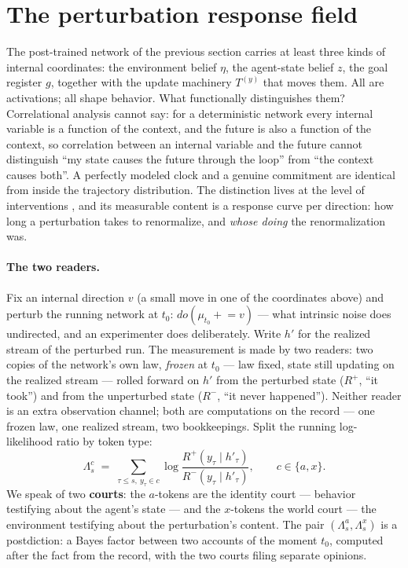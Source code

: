 \documentclass[11pt]{article}
\begin{document}
\section{The perturbation response field}
\label{sec:kappa}

The post-trained network of the previous section carries at least three kinds of internal coordinates: the environment belief $\eta$, the agent-state belief $z$, the goal register $g$, together with the update machinery $T^{(y)}$ that moves them. All are activations; all shape behavior. What functionally distinguishes them? Correlational analysis cannot say: for a deterministic network every internal variable is a function of the context, and the future is also a function of the context, so correlation between an internal variable and the future cannot distinguish ``my state causes the future through the loop'' from ``the context causes both''. A perfectly modeled clock and a genuine commitment are identical from inside the trajectory distribution. The distinction lives at the level of interventions \citep{pearl2009}, and its measurable content is a response curve per direction: how long a perturbation takes to renormalize, and \emph{whose doing} the renormalization was.

\paragraph{The two readers.} Fix an internal direction $v$ (a small move in one of the coordinates above) and perturb the running network at $t_0$: $do(\mu_{t_0} \mathrel{+}\!\!= v)$ --- what intrinsic noise does undirected, and an experimenter does deliberately. Write $h'$ for the realized stream of the perturbed run. The measurement is made by two readers: two copies of the network's own law, \emph{frozen} at $t_0$ --- law fixed, state still updating on the realized stream --- rolled forward on $h'$ from the perturbed state ($R^{+}$, ``it took'') and from the unperturbed state ($R^{-}$, ``it never happened''). Neither reader is an extra observation channel; both are computations on the record --- one frozen law, one realized stream, two bookkeepings. Split the running log-likelihood ratio by token type:
\begin{equation}
\tag{$\Lambda_c$}\label{eq:court-ratio}
\Lambda^{c}_s \;=\; \sum_{\tau \le s,\ y_\tau \in c} \log \frac{R^{+}(y_\tau \mid h'_\tau)}{R^{-}(y_\tau \mid h'_\tau)},
\qquad c \in \{a, x\}.
\end{equation}
We speak of two \textbf{courts}: the $a$-tokens are the identity court --- behavior testifying about the agent's state --- and the $x$-tokens the world court --- the environment testifying about the perturbation's content. The pair $(\Lambda^a_s, \Lambda^x_s)$ is a postdiction: a Bayes factor between two accounts of the moment $t_0$, computed after the fact from the record, with the two courts filing separate opinions.
\end{document}
